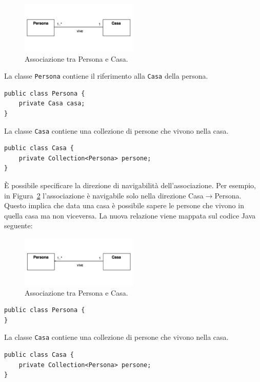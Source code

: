 \documentclass{article}
\begin{document}
\begin{figure}[h!]
  \centering
    \includegraphics[width=0.5\textwidth]{Img/Associazione.pdf}
      \caption{Associazione tra Persona e Casa.}
      \label{Fig:Associazione}
\end{figure}

La classe \texttt{Persona} contiene il riferimento alla \texttt{Casa} della persona.

\begin{lstlisting}
public class Persona {
    private Casa casa; 
}
\end{lstlisting}
La classe \texttt{Casa} contiene una collezione di persone che vivono nella casa.
\begin{lstlisting}
public class Casa {
    private Collection<Persona> persone; 
}
\end{lstlisting}
\`E possibile specificare la direzione di navigabilit\`a dell'associazione. 
Per esempio, in Figura~\ref{Fig:Associazione2} l'associazione \`e navigabile solo nella direzione Casa$\rightarrow$Persona. Questo implica che data una casa \`e possibile sapere le persone che vivono in quella casa ma non viceversa. La nuova relazione viene mappata sul codice Java seguente:

\begin{figure}[h!]
  \centering
    \includegraphics[width=0.5\textwidth]{Img/Associazione2.pdf}
      \caption{Associazione tra Persona e Casa.}
      \label{Fig:Associazione2}
\end{figure}

\begin{lstlisting}
public class Persona {
}
\end{lstlisting}
La classe \texttt{Casa} contiene una collezione di persone che vivono nella casa.
\begin{lstlisting}
public class Casa {
    private Collection<Persona> persone; 
}
\end{lstlisting}
\end{document}
